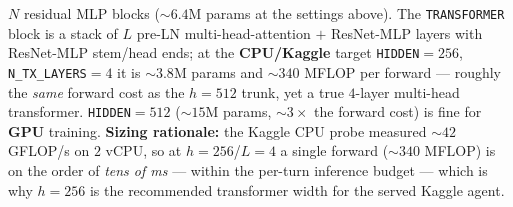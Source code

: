\documentclass[11pt]{article}
\begin{document}
$N$ residual MLP blocks (${\sim}6.4$M params at the settings above). The \texttt{TRANSFORMER} block is a
stack of $L$ pre-LN multi-head-attention $+$ ResNet-MLP layers with ResNet-MLP stem/head ends; at the
\textbf{CPU/Kaggle} target \texttt{HIDDEN}$=256$, \texttt{N\_TX\_LAYERS}$=4$ it is ${\sim}3.8$M params
and ${\sim}340$ MFLOP per forward --- roughly the \emph{same} forward cost as the $h{=}512$ trunk, yet a
true $4$-layer multi-head transformer. \texttt{HIDDEN}$=512$ (${\sim}15$M params, ${\sim}3\times$ the
forward cost) is fine for \textbf{GPU} training. \textbf{Sizing rationale:} the Kaggle CPU probe measured
${\sim}42$ GFLOP/s on $2$ vCPU, so at $h{=}256$/$L{=}4$ a single forward (${\sim}340$ MFLOP) is on the
order of \emph{tens of ms} --- within the per-turn inference budget --- which is why $h{=}256$ is the
recommended transformer width for the served Kaggle agent.
\end{document}
